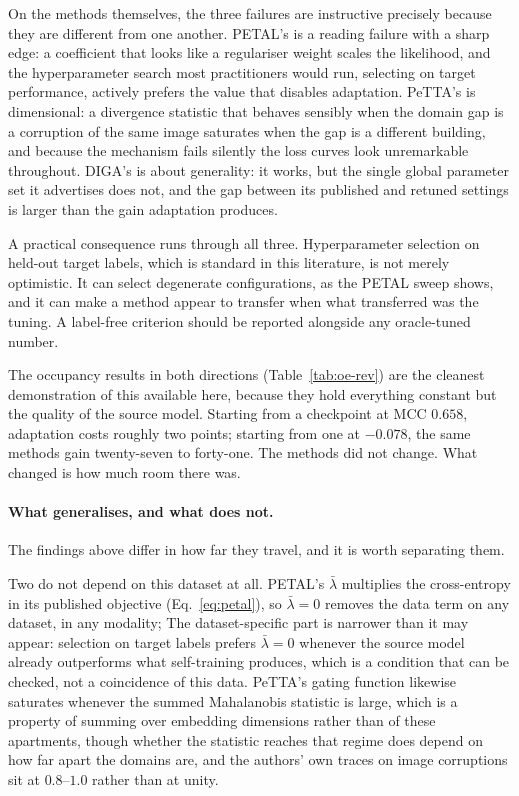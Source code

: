 \documentclass[a4paper,fleqn]{cas-dc}
\begin{document}
On the methods themselves, the three failures are instructive precisely because they are
different from one another. PETAL's is a reading failure with a sharp edge: a coefficient
that looks like a regulariser weight scales the likelihood, and the hyperparameter search
most practitioners would run, selecting on target performance, actively prefers the
value that disables adaptation. PeTTA's is dimensional: a divergence statistic that behaves
sensibly when the domain gap is a corruption of the same image saturates when the gap is a
different building, and because the mechanism fails silently the loss curves look
unremarkable throughout. DIGA's is about generality: it works, but the single global
parameter set it advertises does not, and the gap between its published and retuned
settings is larger than the gain adaptation produces.

A practical consequence runs through all three. Hyperparameter selection on held-out target
labels, which is standard in this literature, is not merely optimistic. It can select degenerate configurations, as the PETAL sweep shows, and it can
make a method appear to transfer when what transferred was the tuning. A label-free
criterion should be reported alongside any oracle-tuned number.

The occupancy results in both directions (Table~\ref{tab:oe-rev}) are the cleanest
demonstration of this available here, because they hold everything constant but the
quality of the source model. Starting from a checkpoint at MCC $0.658$, adaptation costs
roughly two points; starting from one at $-0.078$, the same methods gain twenty-seven to
forty-one. The methods did not change. What changed is how much room there was.

\paragraph{What generalises, and what does not.} The findings above differ in how far
they travel, and it is worth separating them.

Two do not depend on this dataset at all. PETAL's $\bar\lambda$ multiplies the
cross-entropy in its published objective (Eq.~\ref{eq:petal}), so $\bar\lambda=0$ removes
the data term on any dataset, in any modality; The dataset-specific part is
narrower than it may appear: selection on target labels prefers $\bar\lambda=0$ whenever
the source model already outperforms what self-training produces, which is a condition
that can be checked, not a coincidence of this data. PeTTA's gating function
likewise saturates whenever the summed Mahalanobis statistic is large, which is a property
of summing over embedding dimensions rather than of these apartments, though whether
the statistic reaches that regime does depend on how far apart the domains are, and the
authors' own traces on image corruptions sit at $0.8$--$1.0$ rather than at unity.
\end{document}
